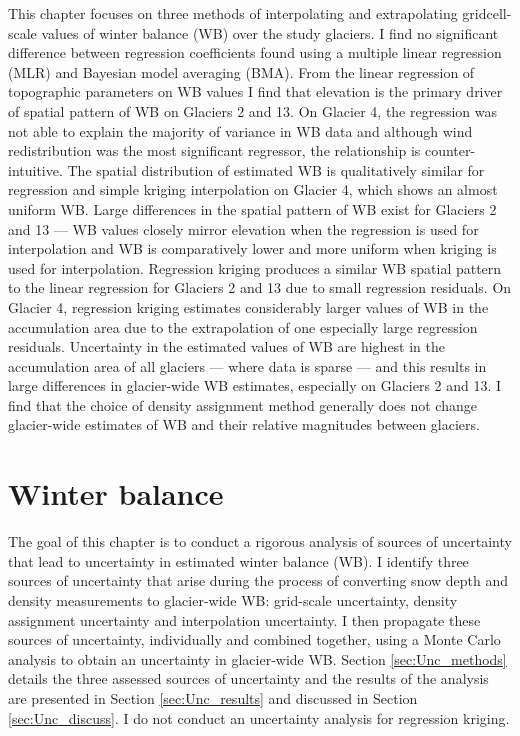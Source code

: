 \documentclass{sfuthesis}
\begin{document}
This chapter focuses on three methods of interpolating and extrapolating gridcell-scale values of winter balance (WB) over the study glaciers. I find no significant difference between regression coefficients found using a multiple linear regression (MLR) and Bayesian model averaging (BMA). From the linear regression of topographic parameters on WB values I find that elevation is the primary driver of spatial pattern of WB on Glaciers 2 and 13. On Glacier 4, the regression was not able to explain the majority of variance in WB data and although wind redistribution was the most significant regressor, the relationship is counter-intuitive.  The spatial distribution of estimated WB is qualitatively similar for regression and simple kriging interpolation on Glacier 4, which shows an almost uniform WB. Large differences in the spatial pattern of WB exist for Glaciers 2 and 13 --- WB values closely mirror elevation when the regression is used for interpolation and WB is comparatively lower and more uniform when kriging is used for interpolation. Regression kriging produces a similar WB spatial pattern to the linear regression for Glaciers 2 and 13 due to small regression residuals. On Glacier 4, regression kriging estimates considerably larger values of WB in the accumulation area due to the extrapolation of one especially large regression residuals. Uncertainty in the estimated values of WB are highest in the accumulation area of all glaciers --- where data is sparse --- and this results in large differences in glacier-wide WB estimates, especially on Glaciers 2 and 13. I find that the choice of density assignment method generally does not change glacier-wide estimates of WB and their relative magnitudes between glaciers.




\chapter{Winter balance }
\label{sec:WinterBalance}

The goal of this chapter is to conduct a rigorous analysis of sources of uncertainty that lead to uncertainty in estimated winter balance (WB). I identify three sources of uncertainty that arise during the process of converting snow depth and density measurements to glacier-wide WB: grid-scale uncertainty, density assignment uncertainty and interpolation uncertainty. I then propagate these sources of uncertainty, individually and combined together, using a Monte Carlo analysis to obtain an uncertainty in glacier-wide WB. Section \ref{sec:Unc_methods} details the three assessed sources of uncertainty and the results of the analysis are presented in Section \ref{sec:Unc_results} and discussed in Section \ref{sec:Unc_discuss}. I do not conduct an uncertainty analysis for regression kriging. 
\end{document}
